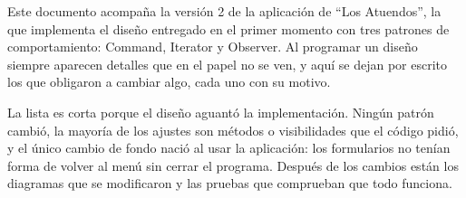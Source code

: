 %
%

Este documento acompaña la versión 2 de la aplicación de ``Los Atuendos'', la que implementa el diseño entregado en el primer momento con tres patrones de comportamiento: Command, Iterator y Observer. Al programar un diseño siempre aparecen detalles que en el papel no se ven, y aquí se dejan por escrito los que obligaron a cambiar algo, cada uno con su motivo.

La lista es corta porque el diseño aguantó la implementación. Ningún patrón cambió, la mayoría de los ajustes son métodos o visibilidades que el código pidió, y el único cambio de fondo nació al usar la aplicación: los formularios no tenían forma de volver al menú sin cerrar el programa. Después de los cambios están los diagramas que se modificaron y las pruebas que comprueban que todo funciona.

